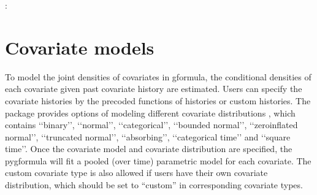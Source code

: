 \documentclass[letterpaper,10pt,english]{sphinxmanual}
\begin{document}
\begin{sphinxVerbatim}[commandchars=\\\{\}]
        
                  
                 
                \PYG{p}{[} \PYG{p}{[} \PYG{p}{]}\PYG{p}{]}
                
\end{sphinxVerbatim}

\sphinxAtStartPar
{}:
\begin{quote}

\end{quote}


\section{Covariate models}
\label{\detokenize{Specifications/Covariate models:covariate-models}}\label{\detokenize{Specifications/Covariate models:id1}}\label{\detokenize{Specifications/Covariate models::doc}}
\sphinxAtStartPar
To model the joint densities of covariates in g\sphinxhyphen{}formula, the conditional densities of each covariate given past covariate history
are estimated. Users can specify the covariate histories by the pre\sphinxhyphen{}coded functions of histories or custom histories.
The package provides options of modeling different covariate distributions
, which contains ‘‘binary’’, ‘‘normal’’, ‘‘categorical’’, ‘‘bounded normal’’, ‘‘zero\sphinxhyphen{}inflated normal’’, ‘‘truncated normal’’, ‘‘absorbing’’, ‘‘categorical time’’
and ‘‘square time’’.
Once the covariate model and covariate distribution are specified, the pygformula will fit a
pooled (over time) parametric model for each covariate. The custom covariate type is also allowed if users have their own
covariate distribution, which should be set to “custom” in corresponding covariate types.
\end{document}
